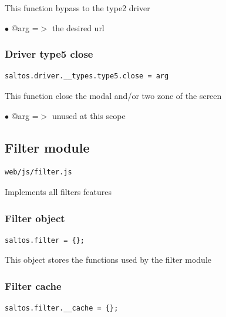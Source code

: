 \documentclass[a4paper]{article}
\begin{document}
This function bypass to the type2 driver

\begin{compactitem}
\item[\color{myblue}$\bullet$] @arg =$>$ the desired url
\end{compactitem}

\hypertarget{toc205}{}
\subsubsection{Driver type5 close}

\begin{lstlisting}
saltos.driver.__types.type5.close = arg
\end{lstlisting}

This function close the modal and/or two zone of the screen

\begin{compactitem}
\item[\color{myblue}$\bullet$] @arg =$>$ unused at this scope
\end{compactitem}

\hypertarget{toc206}{}
\subsection{Filter module}

\begin{lstlisting}
web/js/filter.js
\end{lstlisting}

Implements all filters features

\hypertarget{toc207}{}
\subsubsection{Filter object}

\begin{lstlisting}
saltos.filter = {};
\end{lstlisting}

This object stores the functions used by the filter module

\hypertarget{toc208}{}
\subsubsection{Filter cache}

\begin{lstlisting}
saltos.filter.__cache = {};
\end{lstlisting}
\end{document}
